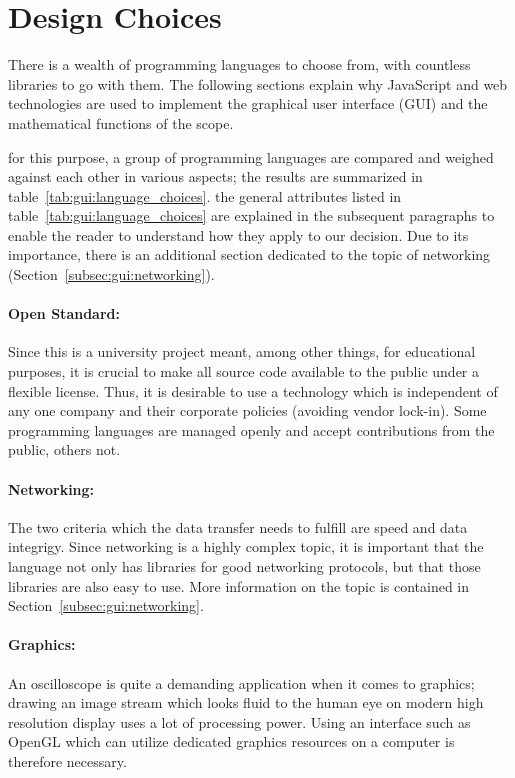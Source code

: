 \section{Design Choices} %
\label{sec:gui:design_choices}

There is  a wealth  of programming  languages to  choose from,  with countless
libraries to go  with them. The following sections explain  why JavaScript and
web technologies are used to implement  the graphical user interface (GUI) and
the mathematical functions of the scope. 

for  this  purpose,  a  group   of  programming  languages  are  compared  and
weighed  against each  other in  various aspects;  the results  are summarized
in   table~\ref{tab:gui:language_choices}.  the   general  attributes   listed
in  table~\ref{tab:gui:language_choices}  are   explained  in  the  subsequent
paragraphs to enable the reader to  understand how they apply to our decision.
Due to its  importance, there is an additional section  dedicated to the topic
of networking (Section~\ref{subsec:gui:networking}).

\paragraph{Open  Standard:} Since this  is a  university project  meant, among
other things, for educational purposes, it  is crucial to make all source code
available to the public under a flexible license. Thus, it is desirable to use
a  technology which  is independent  of any  one company  and their  corporate
policies  (avoiding vendor  lock-in). Some programming  languages are  managed
openly and accept contributions from the public, others not.

\paragraph{Networking:} The  two criteria  which  the data  transfer needs  to
fulfill are  speed and data integrigy.   Since networking is a  highly complex
topic,  it is  important that  the language  not only  has libraries  for good
networking  protocols, but  that those  libraries are  also easy  to use. More
information on the topic is contained in Section~\ref{subsec:gui:networking}.

\paragraph{Graphics:} An oscilloscope is quite a demanding application when it
comes to graphics; drawing an image stream  which looks fluid to the human eye
on modern  high resolution display  uses a  lot of processing  power. Using an
interface such as  OpenGL which can utilize dedicated graphics  resources on a
computer is therefore necessary.


